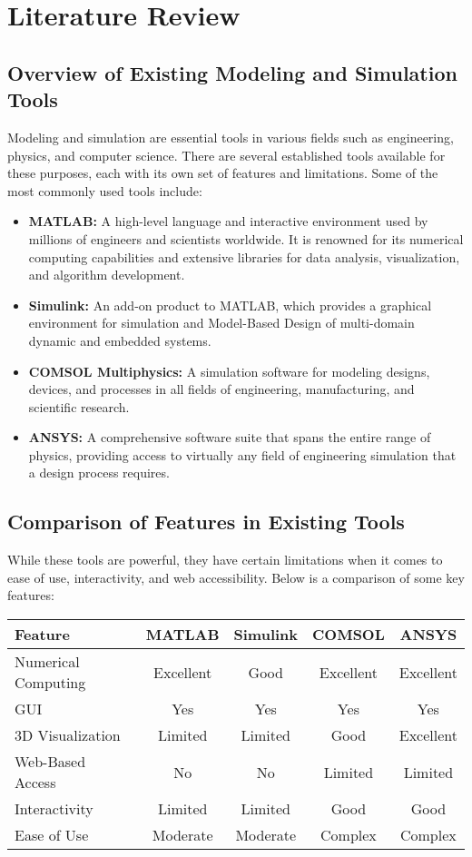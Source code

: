 \chapter{Literature Review}

\section{Overview of Existing Modeling and Simulation Tools}

Modeling and simulation are essential tools in various fields such as engineering, physics, and computer science. There are several established tools available for these purposes, each with its own set of features and limitations. Some of the most commonly used tools include:

\begin{itemize}
    \item \textbf{MATLAB:} A high-level language and interactive environment used by millions of engineers and scientists worldwide. It is renowned for its numerical computing capabilities and extensive libraries for data analysis, visualization, and algorithm development.
    \item \textbf{Simulink:} An add-on product to MATLAB, which provides a graphical environment for simulation and Model-Based Design of multi-domain dynamic and embedded systems.
    \item \textbf{COMSOL Multiphysics:} A simulation software for modeling designs, devices, and processes in all fields of engineering, manufacturing, and scientific research.
    \item \textbf{ANSYS:} A comprehensive software suite that spans the entire range of physics, providing access to virtually any field of engineering simulation that a design process requires.
\end{itemize}

\section{Comparison of Features in Existing Tools}

While these tools are powerful, they have certain limitations when it comes to ease of use, interactivity, and web accessibility. Below is a comparison of some key features:

\begin{tabular}{|l|c|c|c|c|}
    \hline
    \textbf{Feature} & \textbf{MATLAB} & \textbf{Simulink} & \textbf{COMSOL} & \textbf{ANSYS} \\
    \hline
    Numerical Computing & Excellent & Good & Excellent & Excellent \\
    \hline
    GUI & Yes & Yes & Yes & Yes \\
    \hline
    3D Visualization & Limited & Limited & Good & Excellent \\
    \hline
    Web-Based Access & No & No & Limited & Limited \\
    \hline
    Interactivity & Limited & Limited & Good & Good \\
    \hline
    Ease of Use & Moderate & Moderate & Complex & Complex \\
    \hline
\end{tabular}

